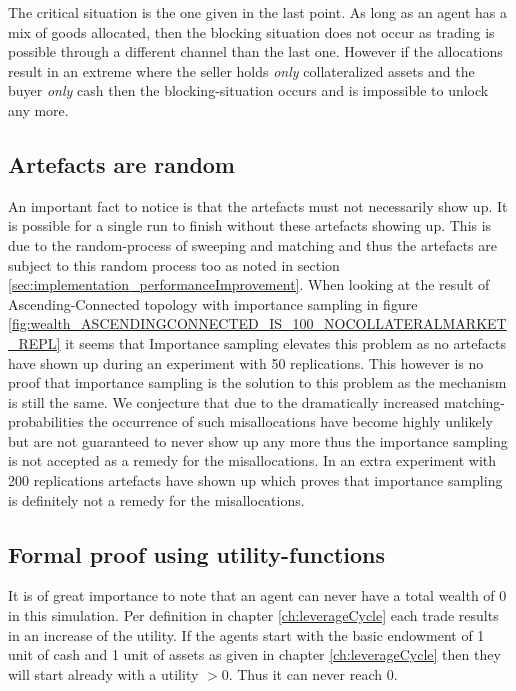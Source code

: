 \documentclass[Bachelorarbeit.tex]{subfiles}
\begin{document}
The critical situation is the one given in the last point. As long as an agent has a mix of goods allocated, then the blocking situation does not occur as trading is possible through a different channel than the last one. However if the allocations result in an extreme where the seller holds \textit{only} collateralized assets and the buyer \textit{only} cash then the blocking-situation occurs and is impossible to unlock any more.

\subsection{Artefacts are random} An important fact to notice is that the artefacts must not necessarily show up. It is possible for a single run to finish without these artefacts showing up. This is due to the random-process of sweeping and matching and thus the artefacts are subject to this random process too as noted in section \ref{sec:implementation_performanceImprovement}. When looking at the result of Ascending-Connected topology with importance sampling in figure \ref{fig:wealth_ASCENDINGCONNECTED_IS_100_NOCOLLATERALMARKET_REPL} it seems that Importance sampling elevates this problem as no artefacts have shown up during an experiment with 50 replications. This however is no proof that importance sampling is the solution to this problem as the mechanism is still the same. We conjecture that due to the dramatically increased matching-probabilities the occurrence of such misallocations have become highly unlikely but are not guaranteed to never show up any more thus the importance sampling is not accepted as a remedy for the misallocations. In an extra experiment with 200 replications artefacts have shown up which proves that importance sampling is definitely not a remedy for the misallocations.

\subsection{Formal proof using utility-functions}
It is of great importance to note that an agent can never have a total wealth of 0 in this simulation. Per definition in chapter \ref{ch:leverageCycle} each trade results in an increase of the utility. If the agents start with the basic endowment of 1 unit of cash and 1 unit of assets as given in chapter \ref{ch:leverageCycle} then they will start already with a utility $> 0$. Thus it can never reach 0.

\medskip
\end{document}
